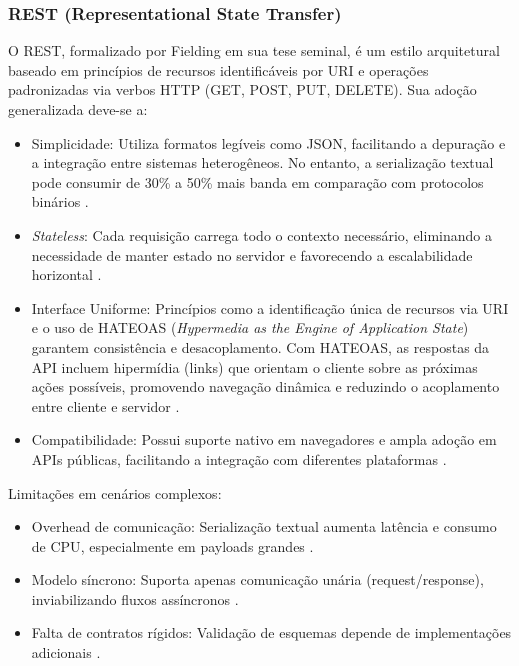 \subsubsection{\texorpdfstring{\gls{REST}}{REST} (Representational State Transfer)}
O \gls{REST}, formalizado por Fielding \cite{fielding2000rest} em sua tese seminal, é um estilo arquitetural baseado em princípios de recursos identificáveis por \gls{URI} e operações padronizadas via verbos \gls{HTTP} (GET, POST, PUT, DELETE). Sua adoção generalizada deve-se a:

\begin{itemize}
    \item Simplicidade: Utiliza formatos legíveis como \gls{JSON}, facilitando a depuração e a integração entre sistemas heterogêneos. No entanto, a serialização textual pode consumir de 30\% a 50\% mais banda em comparação com protocolos binários \cite{niswar2023performance}.
    \item \textit{Stateless}: Cada requisição carrega todo o contexto necessário, eliminando a necessidade de manter estado no servidor e favorecendo a escalabilidade horizontal \cite{fielding2000rest}.
    \item Interface Uniforme: Princípios como a identificação única de recursos via URI e o uso de HATEOAS (\textit{Hypermedia as the Engine of Application State}) garantem consistência e desacoplamento. Com HATEOAS, as respostas da API incluem hipermídia (links) que orientam o cliente sobre as próximas ações possíveis, promovendo navegação dinâmica e reduzindo o acoplamento entre cliente e servidor \cite{maso2024comparativo}.
    \item Compatibilidade: Possui suporte nativo em navegadores e ampla adoção em APIs públicas, facilitando a integração com diferentes plataformas \cite{maso2024comparativo}.
\end{itemize}

Limitações em cenários complexos:
\begin{itemize}
\item Overhead de comunicação: Serialização textual aumenta latência e consumo de \gls{CPU}, especialmente em payloads grandes \cite{niswar2023performance}.
\item Modelo síncrono: Suporta apenas comunicação unária (request/response), inviabilizando fluxos assíncronos \cite{niswar2023performance}.
\item Falta de contratos rígidos: Validação de esquemas depende de implementações adicionais \cite{maso2024comparativo}.
\end{itemize}

